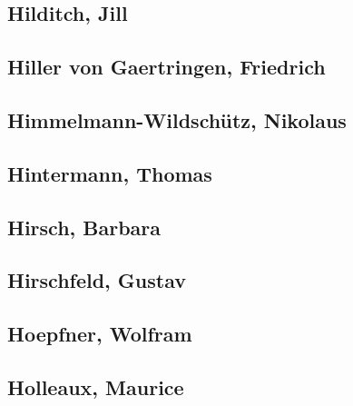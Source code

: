 \subsection[Hilditch, Jill (1)]{Hilditch, Jill}

\subsection[Hiller von Gaertringen, Friedrich (1)]{Hiller von Gaertringen, Friedrich}

\subsection[Himmelmann-Wildschütz, Nikolaus (1)]{Himmelmann-Wildschütz, Nikolaus}

\subsection[Hintermann, Thomas (1)]{Hintermann, Thomas}

\subsection[Hirsch, Barbara (1)]{Hirsch, Barbara}

\subsection[Hirschfeld, Gustav (2)]{Hirschfeld, Gustav}


\subsection[Hoepfner, Wolfram (4)]{Hoepfner, Wolfram}




\subsection[Holleaux, Maurice (3)]{Holleaux, Maurice}

